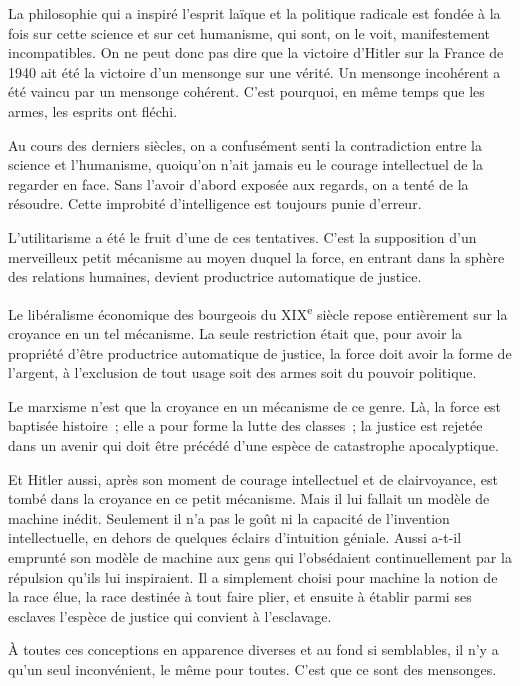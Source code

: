 \documentclass[french,twoside]{book} %
\begin{document}
La philosophie qui a inspiré l'esprit laïque et la politique radicale est fondée à la fois sur cette science et sur cet humanisme, qui sont, on le voit, manifestement incompatibles. On ne peut donc pas dire que la victoire d'Hitler sur la France de 1940 ait été la victoire d'un mensonge sur une vérité. Un mensonge incohérent a été vaincu par un mensonge cohérent. C'est pourquoi, en même temps que les armes, les esprits ont fléchi.\par
Au cours des derniers siècles, on a confusément senti la contradiction entre la science et l'humanisme, quoiqu'on n'ait jamais eu le courage intellectuel de la regarder en face. Sans l'avoir d'abord exposée aux regards, on a tenté de la résoudre. Cette improbité d'intelligence est toujours punie d'erreur.\par
L'utilitarisme a été le fruit d'une de ces tentatives. C'est la supposition d'un merveilleux petit mécanisme au moyen duquel la force, en entrant dans la sphère des relations humaines, devient productrice automatique de justice.\par
Le libéralisme économique des bourgeois du XIX\textsuperscript{e} siècle repose entièrement sur la croyance en un tel mécanisme. La seule restriction était que, pour avoir la propriété d'être productrice automatique de justice, la force doit avoir la forme de l'argent, à l'exclusion de tout usage soit des armes soit du pouvoir politique.\par
Le marxisme n'est que la croyance en un mécanisme de ce genre. Là, la force est baptisée histoire ; elle a pour forme la lutte des classes ; la justice est rejetée dans un avenir qui doit être précédé d'une espèce de catastrophe apocalyptique.\par
Et Hitler aussi, après son moment de courage intellectuel et de clairvoyance, est tombé dans la croyance en ce petit mécanisme. Mais il lui fallait un modèle de machine inédit. Seulement il n'a pas le goût ni la capacité de l'invention intellectuelle, en dehors de quelques éclairs d'intuition géniale. Aussi a-t-il emprunté son modèle de machine aux gens qui l'obsédaient continuellement par la répulsion qu'ils lui inspiraient. Il a simplement choisi pour machine la notion de la race élue, la race destinée à tout faire plier, et ensuite à établir parmi ses esclaves l'espèce de justice qui convient à l'esclavage.\par
À toutes ces conceptions en apparence diverses et au fond si semblables, il n'y a qu'un seul inconvénient, le même pour toutes. C'est que ce sont des mensonges.\par
\end{document}
